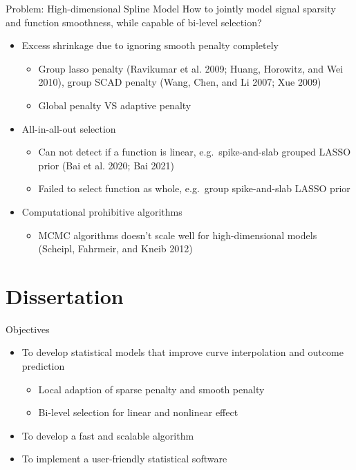 \documentclass[
  ignorenonframetext,
  aspectratio=169]{beamer}
\providecommand{\tightlist}{%
  \setlength{\itemsep}{0pt}\setlength{\parskip}{0pt}}
\begin{document}
\begin{frame}{Problem: High-dimensional Spline Model}
\protect\hypertarget{problem-high-dimensional-spline-model}{}
How to jointly model signal sparsity and function smoothness, while
capable of bi-level selection?

\begin{itemize}
\tightlist
\item
  Excess shrinkage due to ignoring smooth penalty completely

  \begin{itemize}
  \tightlist
  \item
    Group lasso penalty (Ravikumar et al. 2009; Huang, Horowitz, and Wei
    2010), group SCAD penalty (Wang, Chen, and Li 2007; Xue 2009)
  \item
    Global penalty VS adaptive penalty
  \end{itemize}
\item
  All-in-all-out selection

  \begin{itemize}
  \tightlist
  \item
    Can not detect if a function is linear, e.g.~spike-and-slab grouped
    LASSO prior (Bai et al. 2020; Bai 2021)
  \item
    Failed to select function as whole, e.g.~group spike-and-slab LASSO
    prior
  \end{itemize}
\item
  Computational prohibitive algorithms

  \begin{itemize}
  \tightlist
  \item
    MCMC algorithms doesn't scale well for high-dimensional models
    (Scheipl, Fahrmeir, and Kneib 2012)
  \end{itemize}
\end{itemize}
\end{frame}

\hypertarget{dissertation}{%
\section{Dissertation}\label{dissertation}}

\begin{frame}{Objectives}
\protect\hypertarget{objectives}{}
\begin{itemize}
\tightlist
\item
  To develop statistical models that improve curve interpolation and
  outcome prediction

  \begin{itemize}
  \tightlist
  \item
    Local adaption of sparse penalty and smooth penalty
  \item
    Bi-level selection for linear and nonlinear effect
  \end{itemize}
\item
  To develop a fast and scalable algorithm
\item
  To implement a user-friendly statistical software
\end{itemize}
\end{frame}
\end{document}
